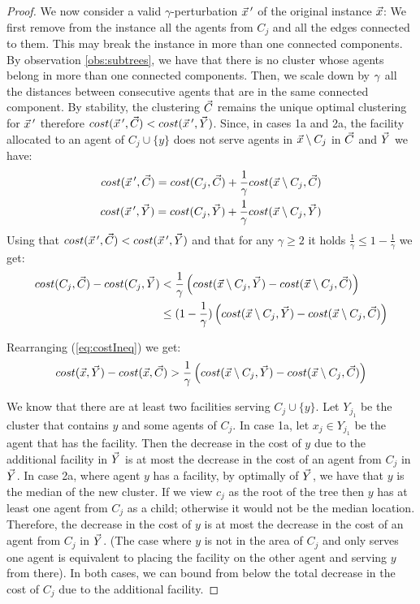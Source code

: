 \begin{proof}
    

We now consider a valid $\gamma$-perturbation $\vec{x}\,'$ of the original instance $\vec{x}$: We first remove from the instance all the agents from $C_j$ and all the edges connected to them. This may break the instance in more than one connected components. By observation \ref{obs:subtrees}, we have that there is no cluster whose agents belong in more than one connected components. Then, we scale down by $\gamma$ all the distances between consecutive agents that are in the same connected component. By stability, the clustering $\vec{C}$ remains the unique optimal clustering for $\vec{x}\,'$ therefore $cost(\vec{x}\,',\vec{C}) < cost(\vec{x}\,',\vec{Y})$. Since, in cases 1a and 2a, the facility allocated to an agent of $C_j\cup \{y\}$ does not serve agents in $\vec{x} \setminus C_j$ in $\vec{C}$ and $\vec{Y}$ we have:
\begin{align*}
 cost(\vec{x}\,', \vec{C}) = cost(C_j,\vec{C})+\frac{1}{\gamma}cost(\vec{x}\setminus C_j,\vec{C})\\
 cost(\vec{x}\,', \vec{Y}) = cost(C_j,\vec{Y})+\frac{1}{\gamma} cost(\vec{x}\setminus C_j,\vec{Y})
\end{align*}
Using that $cost(\vec{x}\,',\vec{C}) < cost(\vec{x}\,',\vec{Y})$ and  that for any $\gamma\ge2$ it holds $\frac{1}{\gamma} \le 1-\frac{1}{\gamma} $ we get:
\begin{align}
   cost(C_j,\vec{C}) - cost(C_j,\vec{Y}) &< \frac{1}{\gamma} \left( cost(\vec{x}\setminus C_j,\vec{Y}) - cost(\vec{x}\setminus C_j,\vec{C}) \right)\label{eq:costIneq1} \\
    &\le (1 -\frac{1}{\gamma}) \left( cost(\vec{x}\setminus C_j,\vec{Y}) - cost(\vec{x}\setminus C_j,\vec{C}) \right) \label{eq:costIneq}
\end{align}

Rearranging (\ref{eq:costIneq}) we get:
\begin{equation}
    cost(\vec{x},\vec{Y}) - cost(\vec{x},\vec{C}) > \frac{1}{\gamma}\left( cost(\vec{x}\setminus C_j,\vec{Y}) - cost(\vec{x}\setminus C_j,\vec{C}) \right)\label{eq:lowerBcostY}
\end{equation}

 
We know that there are at least two facilities serving $C_j\cup\{y\}$. Let $Y_{j_1}$ be the cluster that contains $y$ and some agents of $C_j$. In case 1a, let $x_j \in Y_{j_1}$ be the agent that has the facility. Then the decrease in the cost of $y$ due to the additional facility in $\vec{Y}$ is at most the decrease in the cost of an agent from $C_j$ in $\vec{Y}$. In case 2a, where agent $y$ has a facility, by optimally of $\vec{Y}$, we have that $y$ is the median of the new cluster. If we view $c_j$ as the root of the tree then $y$ has at least one agent from $C_j$ as a child; otherwise it would not be the median location. Therefore, the decrease in the cost of $y$ is at most the decrease in the cost of an agent from $C_j$ in $\vec{Y}$. (The case where $y$ is not in the area of $C_j$ and only serves one agent is equivalent to placing the facility on the other agent and serving $y$ from there). In both cases, we can bound from below the total decrease in the cost of $C_j$ due to the additional facility.


\end{proof}
